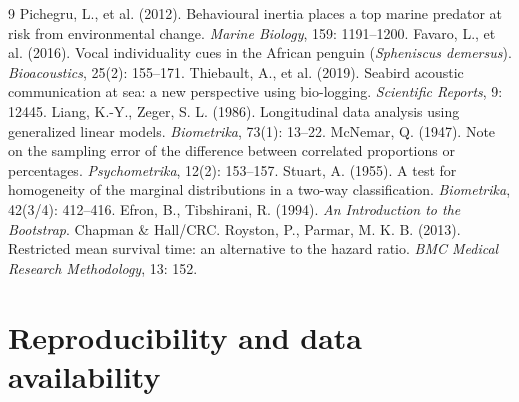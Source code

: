 \documentclass{apmcmthesis}
\begin{document}
\begin{abstract}
\end{abstract}

\newpage
\setcounter{tocdepth}{1}
\tableofcontents

\newpage
\pagestyle{mainmatterstyle}
\setcounter{page}{1}










\footnotesize
\begin{thebibliography}{9}
 Pichegru, L., et al. (2012). Behavioural inertia places a top marine predator at
risk from environmental change. \textit{Marine Biology}, 159: 1191--1200.
 Favaro, L., et al. (2016). Vocal individuality cues in the African penguin
(\textit{Spheniscus demersus}). \textit{Bioacoustics}, 25(2): 155--171.
 Thiebault, A., et al. (2019). Seabird acoustic communication at sea: a new
perspective using bio-logging. \textit{Scientific Reports}, 9: 12445.
 Liang, K.-Y., Zeger, S. L. (1986). Longitudinal data analysis using generalized
linear models. \textit{Biometrika}, 73(1): 13--22.
 McNemar, Q. (1947). Note on the sampling error of the difference between
correlated proportions or percentages. \textit{Psychometrika}, 12(2): 153--157.
 Stuart, A. (1955). A test for homogeneity of the marginal distributions in a two-way
classification. \textit{Biometrika}, 42(3/4): 412--416.
 Efron, B., Tibshirani, R. (1994). \textit{An Introduction to the Bootstrap}.
Chapman \& Hall/CRC.
 Royston, P., Parmar, M. K. B. (2013). Restricted mean survival time: an
alternative to the hazard ratio. \textit{BMC Medical Research Methodology}, 13: 152.
\end{thebibliography}

\newpage
\appendix
\section{Reproducibility and data availability}

\end{document}
